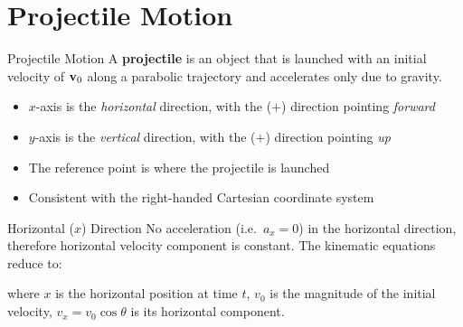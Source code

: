 \documentclass[12pt,compress,aspectratio=169]{beamer}
\newcommand{\mb}[1]{\ensuremath\mathbf{#1}}
\newcommand{\eq}[2]{\vspace{#1}{\Large\begin{displaymath}#2\end{displaymath}}}
\begin{document}
\section{Projectile Motion}

\begin{frame}{Projectile Motion}
  A \textbf{projectile} is an object that is launched with an initial velocity
  of $\mb{v}_0$ along a parabolic trajectory and accelerates only due to
  gravity.
  \begin{center}
  \end{center}
  \begin{itemize}
  \item $x$-axis is the \emph{horizontal} direction, with the ($+$) direction
    pointing \emph{forward}
  \item $y$-axis is the \emph{vertical} direction, with the ($+$) direction
    pointing \emph{up}
  \item The reference point is where the projectile is launched
  \item Consistent with the right-handed Cartesian coordinate system
  \end{itemize}
\end{frame}



\begin{frame}{Horizontal ($x$) Direction}
  No acceleration (i.e.\ $a_x=\num{0}$) in the horizontal direction, therefore
  horizontal velocity component is constant. The kinematic equations reduce to:

  \eq{-.2in}{
    x=v_xt=\left[v_0\cos\theta\right] t
  }

  where $x$ is the horizontal position at time $t$, $v_0$ is the
  magnitude of the initial velocity, $v_x=v_0\cos\theta$ is its horizontal
  component.
\end{frame}
\end{document}
